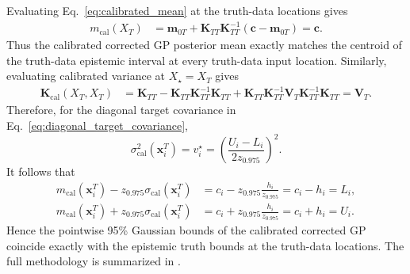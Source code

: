 \documentclass[journal]{new-aiaa}
\newcommand{\x}{\mathbf{x}}
\begin{document}
Evaluating Eq.~\eqref{eq:calibrated_mean} at the truth-data locations gives
\begin{align*}
    m_{\mathrm{cal}}(X_T)
    &=
    \mathbf{m}_{0T}
    +
    \mathbf{K}_{TT}
    \mathbf{K}_{TT}^{-1}
    \left(
    \mathbf{c}
    -
    \mathbf{m}_{0T}
    \right)
    \nonumber = \mathbf{c}.
\end{align*}
Thus the calibrated corrected GP posterior mean exactly matches the centroid of
the truth-data epistemic interval at every truth-data input location.
Similarly, evaluating calibrated variance at
$X_\star=X_T$ gives
\begin{align*}
    \mathbf{K}_{\mathrm{cal}}(X_T,X_T)
    &=
    \mathbf{K}_{TT}
    -
    \mathbf{K}_{TT}
    \mathbf{K}_{TT}^{-1}
    \mathbf{K}_{TT}
    +
    \mathbf{K}_{TT}
    \mathbf{K}_{TT}^{-1}
    \mathbf{V}_T
    \mathbf{K}_{TT}^{-1}
    \mathbf{K}_{TT}
    \nonumber = \mathbf{V}_T.
\end{align*}
Therefore, for the diagonal target covariance in
Eq.~\eqref{eq:diagonal_target_covariance},
\begin{equation*}
    \sigma_{\mathrm{cal}}^2(\x_i^T)
    =
    v_i^\star
    =
    \left(
    \frac{U_i-L_i}{2z_{0.975}}
    \right)^2.
\end{equation*}
It follows that
\begin{align*}
    m_{\mathrm{cal}}(\x_i^T)
    -
    z_{0.975}
    \sigma_{\mathrm{cal}}(\x_i^T)
    &=
    c_i
    -
    z_{0.975}
    \frac{h_i}{z_{0.975}}
    =
    c_i-h_i
    =
    L_i,
    \\
    m_{\mathrm{cal}}(\x_i^T)
    +
    z_{0.975}
    \sigma_{\mathrm{cal}}(\x_i^T)
    &=
    c_i
    +
    z_{0.975}
    \frac{h_i}{z_{0.975}}
    =
    c_i+h_i
    =
    U_i.
\end{align*}
Hence the pointwise 95\% Gaussian bounds of the calibrated corrected GP coincide
exactly with the epistemic truth bounds at the truth-data locations. The full methodology is summarized in .
\end{document}
